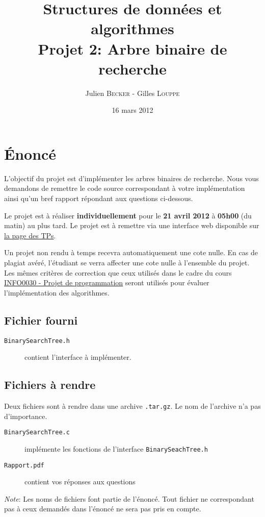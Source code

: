 \documentclass[a4paper,10pt]{article}
\title{
    \textbf{Structures de données et algorithmes}\\
    Projet 2: Arbre binaire de recherche
}
\author{Julien \textsc{Becker} - Gilles \textsc{Louppe}}
\date{16 mars 2012}
\begin{document}
\maketitle

\section*{\'Enoncé}

L'objectif du projet est d'implémenter les arbres binaires de recherche. Nous vous demandons de remettre le code source correspondant à votre implémentation ainsi qu'un bref rapport répondant aux questions ci-dessous.

Le projet est à réaliser {\bf individuellement} pour le {\bf 21 avril 2012} à
{\bf 05h00} (du matin) au plus tard. Le projet est à remettre via une interface
web disponible sur \href{http://www.montefiore.ulg.ac.be/~glouppe/2011-2012/students.info0902.php}{la page des TPs}.

Un projet non rendu à temps recevra automatiquement une cote nulle. En cas de
plagiat avéré, l'étudiant se verra affecter une cote nulle à l'ensemble du
projet. Les mêmes critères de correction que ceux utilisés dans le cadre du
cours \href{http://www.montefiore.ulg.ac.be/~info0030/}{INFO0030 - Projet de programmation}
seront utilisés pour évaluer l'implémentation des algorithmes.

\subsection*{Fichier fourni}
\begin{description}
\item[\texttt{BinarySearchTree.h}] contient l'interface à implémenter.
\end{description}
\subsection*{Fichiers à rendre}
Deux fichiers sont à rendre dans une archive \texttt{.tar.gz}. Le nom de l'archive n'a pas d'importance.
\begin{description}
\item[\texttt{BinarySearchTree.c}] implémente les fonctions de l'interface \texttt{BinarySeachTree.h}
\item[\texttt{Rapport.pdf}] contient vos réponses aux questions
\end{description}

{\em Note}: Les noms de fichiers font partie de l'énoncé. Tout fichier ne
correspondant pas à ceux demandés dans l'énoncé ne sera pas pris en compte.
\end{document}

